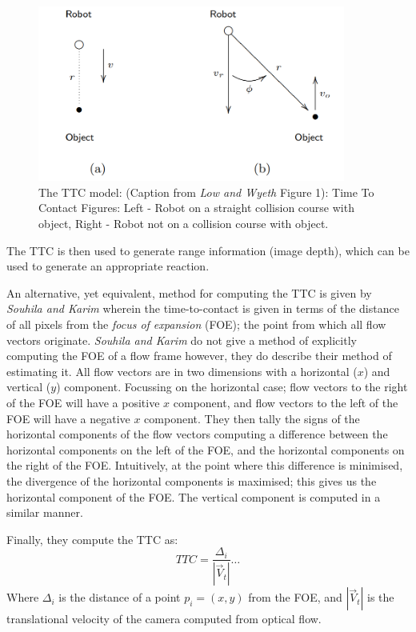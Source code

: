 \documentclass[a4paper,11pt,twoside,openright]{article}
\begin{document}
\begin{figure}
  \centering
  \includegraphics[width=0.9\textwidth]{LowOFModel}
  \caption{
    \label{fig:lowof} The TTC model: (Caption from \textit{Low and Wyeth} Figure 1):
    Time To Contact Figures: Left - Robot on a straight collision course with object,
    Right - Robot not on a collision course with object.
  }
\end{figure}


The TTC is then used to generate range information (image depth), which can be used to generate an
appropriate reaction.
\newline

An alternative, yet equivalent, method for computing the TTC is given by \textit{Souhila and Karim}
wherein the time-to-contact is given in terms of the distance of all pixels from the \textit{focus of expansion}
(FOE); the point from which all flow vectors originate. \textit{Souhila and Karim} do
not give a method of explicitly computing the FOE of a flow frame
however, they do describe their method of estimating it. All flow vectors are in two dimensions with a
horizontal ($x$) and vertical ($y$) component. Focussing on the horizontal case; flow vectors to the
right of the FOE will have a positive $x$ component, and flow vectors to the left of the FOE will have a negative
$x$ component. They then tally the signs of the horizontal components of the flow vectors computing a
difference between the horizontal components on the left of the FOE, and the horizontal components on the
right of the FOE. Intuitively, at the point where this difference is minimised, the divergence of the
horizontal components is maximised; this gives us the horizontal component of the FOE. The vertical
component is computed in a similar manner.
\newline

Finally, they compute the TTC as:
\begin{equation}
TTC = \frac{\Delta_i}{|\vec{V}_t|} \dots
\end{equation}
Where $\Delta_i$ is the distance of a point $p_i = (x,y)$ from the FOE, and $|\vec{V}_t|$ is the
translational velocity of the camera computed from optical flow\cite{Souhila2007}.
\newline
\end{document}
